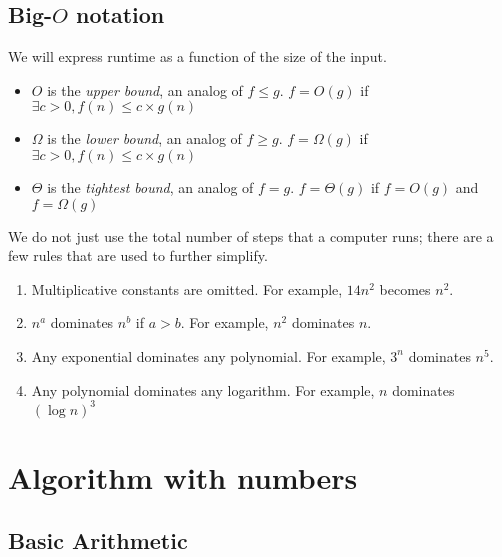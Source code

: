 \subsection{Big-$O$ notation}
We will express runtime as a function of the size of the input.
\begin{itemize}
  \item $O$ is the \emph{upper bound}, an analog of $f \leq g$. $f = O(g)$ if $\exists c > 0, f(n) \leq c \times g(n)$
  \item $\Omega$ is the \emph{lower bound}, an analog of $f \geq g$. $f = \Omega(g)$ if $\exists c > 0, f(n) \leq c \times g(n)$
  \item $\Theta$ is the \emph{tightest bound}, an analog of $f = g$. $f = \Theta(g)$ if $f = O(g)$ and $f = \Omega(g)$
\end{itemize}
We do not just use the total number of steps that a computer runs; there are a few rules that are used to further simplify.
\begin{enumerate}
  \item Multiplicative constants are omitted. For example, $14n^2$ becomes $n^2$.
  \item $n^a$ dominates $n^b$ if $a > b$. For example, $n^2$ dominates $n$.
  \item Any exponential dominates any polynomial. For example, $3^n$ dominates $n^5$.
  \item Any polynomial dominates any logarithm. For example, $n$ dominates $(\log n)^3$
\end{enumerate}
\newpage

\section{Algorithm with numbers}

\subsection{Basic Arithmetic}
